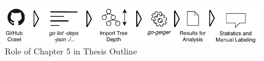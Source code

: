 \begin{figure}[ht]
    \includegraphics[width=\textwidth]{assets/figures/chapter5/outline.pdf}
    \caption{Role of Chapter 5 in Thesis Outline}
    \label{fig:outline5}
\end{figure}
